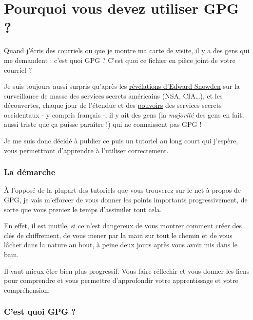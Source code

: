 \chapter[Introduction]{Pourquoi vous devez utiliser GPG ?}

Quand j'écris des courriels ou que je montre ma carte de visite, il y a
des gens qui me demandent : c'est quoi GPG ? C'est quoi ce fichier en
pièce joint de votre courriel ?

\begin{figure}[htbp]
\centering
\caption{}
\end{figure}

Je suis toujours aussi surpris qu'après les
\href{http://fr.wikipedia.org/wiki/R\%C3\%A9v\%C3\%A9lations_d\%27Edward_Snowden}{révélations
d'Edward Snowden} sur la surveillance de masse des services secrets
américains (NSA, CIA\ldots{}), et les découvertes, chaque jour de
l'étendue et des \href{http://www.lemonde.fr/pixels/article/2015/02/17/un-nouveau-logiciel-espion-de-la-nsa-mis-au-jour_4577707_4408996.html}{pouvoirs}
des services secrets occidentaux - y compris français -, il y ait des
gens (la \emph{majorité} des gens en fait, aussi triste que ça puisse
paraître !) qui ne connaissent pas GPG !

Je me suis donc décidé à publier ce puis un tutoriel au long court qui j'espère, vous permettront d'apprendre à l'utiliser correctement.

\subsection{La démarche}\label{la-duxe9marche}

À l'opposé de la plupart des tutoriels que vous trouverez sur le net à
propos de GPG, je vais m'efforcer de vous donner les points importants
progressivement, de sorte que vous preniez le temps d'assimiler tout
cela.

En effet, il est inutile, si ce n'est dangereux de vous montrer comment
créer des clés de chiffrement, de vous mener par la main sur tout le
chemin et de vous lâcher dans la nature au bout, à peine deux jours
après vous avoir mis dans le bain.

Il vaut mieux être bien plus progressif. Vous faire réflechir et vous
donner les liens pour comprendre et vous permettre d'approfondir votre
apprentissage et votre compréhension.

\subsection{C'est quoi GPG ?}\label{cest-quoi-gpg}

